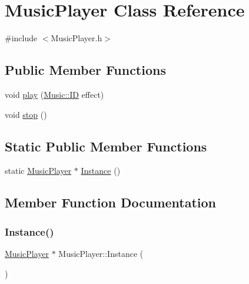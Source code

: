 \hypertarget{class_music_player}{}\section{Music\+Player Class Reference}
\label{class_music_player}


{\ttfamily \#include $<$Music\+Player.\+h$>$}

\subsection*{Public Member Functions}
\begin{DoxyCompactItemize}
\item 
void \hyperlink{class_music_player_aa3273ed0e4d434993a80b04c1c5b9b97}{play} (\hyperlink{namespace_music_ad5e0c8c2e2e7bdcbffbb125051531b86}{Music\+::\+ID} effect)
\item 
void \hyperlink{class_music_player_a54e47a9e937730493d886aa5624c44d1}{stop} ()
\end{DoxyCompactItemize}
\subsection*{Static Public Member Functions}
\begin{DoxyCompactItemize}
\item 
static \hyperlink{class_music_player}{Music\+Player} $\ast$ \hyperlink{class_music_player_abd76f55305c7da80db33a23ee515c228}{Instance} ()
\end{DoxyCompactItemize}


\subsection{Member Function Documentation}
\mbox{\label{class_music_player_abd76f55305c7da80db33a23ee515c228}} 
\subsubsection{\texorpdfstring{Instance()}{Instance()}}
{\footnotesize\ttfamily \hyperlink{class_music_player}{Music\+Player} $\ast$ Music\+Player\+::\+Instance (\begin{DoxyParamCaption}{ }\end{DoxyParamCaption})\hspace{0.3cm}{\ttfamily [static]}}


